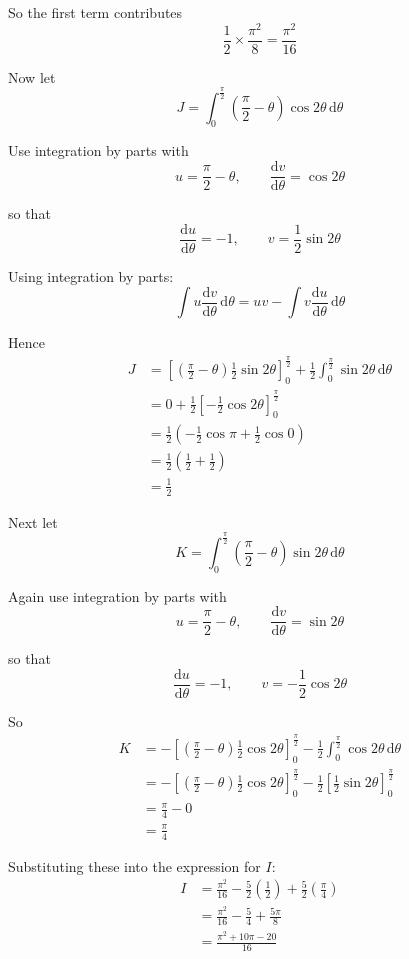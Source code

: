 \documentclass[leqno]{article}
\begin{document}
\begin{enumerate}[
  label=\textbf{\arabic*.},
  leftmargin=*,
  topsep=0pt,
  partopsep=0pt,
  parsep=0pt
]
\begin{djsSolution}
\begin{enumerate}[label=\textbf{(\alph*)}]
So the first term contributes
\[
\frac12\times\frac{\pi^2}{8}=\frac{\pi^2}{16}
\]

Now let
\[
J=\int_{0}^{\frac{\pi}{2}}\left(\frac{\pi}{2}-\theta\right)\cos2\theta\,\mathrm{d}\theta
\]

Use integration by parts with
\[
u=\frac{\pi}{2}-\theta,\qquad \frac{\mathrm{d}v}{\mathrm{d}\theta}=\cos2\theta
\]

so that
\[
\frac{\mathrm{d}u}{\mathrm{d}\theta}=-1,\qquad v=\frac12\sin2\theta
\]

Using integration by parts:
\[
\int u\frac{\mathrm{d}v}{\mathrm{d}\theta}\,\mathrm{d}\theta = uv - \int v\frac{\mathrm{d}u}{\mathrm{d}\theta}\,\mathrm{d}\theta
\]

Hence
\begin{align*}
J
&=\left[\left(\frac{\pi}{2}-\theta\right)\frac12\sin2\theta\right]_{0}^{\frac{\pi}{2}}
+\frac12\int_{0}^{\frac{\pi}{2}}\sin2\theta\,\mathrm{d}\theta\\
&=0+\frac12\left[-\frac12\cos2\theta\right]_{0}^{\frac{\pi}{2}}\\
&=\frac12\left(-\frac12\cos\pi+\frac12\cos0\right)\\
&=\frac12\left(\frac12+\frac12\right)\\
&=\frac12
\end{align*}

Next let
\[
K=\int_{0}^{\frac{\pi}{2}}\left(\frac{\pi}{2}-\theta\right)\sin2\theta\,\mathrm{d}\theta
\]

Again use integration by parts with
\[
u=\frac{\pi}{2}-\theta,\qquad \frac{\mathrm{d}v}{\mathrm{d}\theta}=\sin2\theta
\]

so that
\[
\frac{\mathrm{d}u}{\mathrm{d}\theta}=-1,\qquad v=-\frac12\cos2\theta
\]

So
\begin{align*}
K
&=-\left[\left(\frac{\pi}{2}-\theta\right)\frac12\cos2\theta\right]_{0}^{\frac{\pi}{2}}
-\frac12\int_{0}^{\frac{\pi}{2}}\cos2\theta\,\mathrm{d}\theta\\
&=-\left[ \left(\frac{\pi}{2}-\theta\right)\frac12\cos2\theta \right]_{0}^{\frac{\pi}{2}}
-\frac12\left[\frac12\sin2\theta\right]_{0}^{\frac{\pi}{2}}\\
&=\frac{\pi}{4}-0\\
&=\frac{\pi}{4}
\end{align*}

Substituting these into the expression for \(I\):
\begin{align*}
I
&=\frac{\pi^2}{16}-\frac52\left(\frac12\right)+\frac52\left(\frac{\pi}{4}\right)\\
&=\frac{\pi^2}{16}-\frac54+\frac{5\pi}{8}\\
&=\frac{\pi^2+10\pi-20}{16}
\end{align*}


\end{enumerate}
\end{djsSolution}
\end{enumerate}
\end{document}
